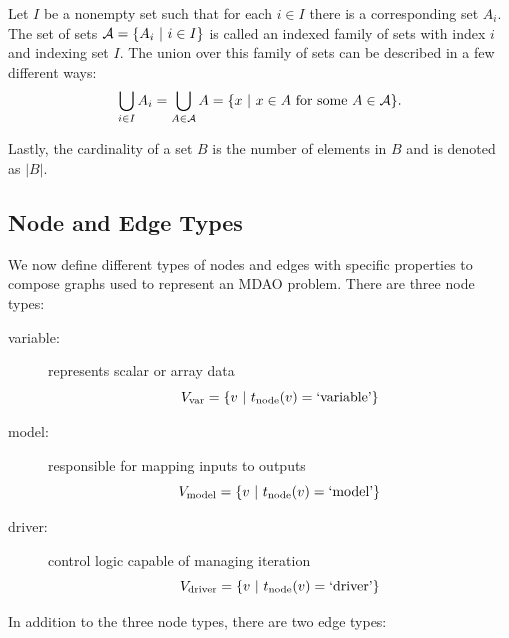   Let $I$ be a nonempty set such that for each $i \in I$ there is a corresponding set $A_i$. 
  The set of sets $\mathcal A = \{A_i \ | \  i \in I\}$ is called an indexed family of sets with index $i$ and 
  indexing set $I$\cite{smith2006}. 
  The union over this family of sets can be described in a few different ways:
  \begin{equation}
  \bigcup_{i \in I} A_i = \bigcup_{A \in \mathcal A} A = \{x \ | \  x \in A \textrm{ for some } A \in \mathcal A\}.
  \end{equation}

  Lastly, the cardinality of a set $B$ is the number of elements in $B$ and is denoted as $|B|$.

\subsection{Node and Edge Types}
  \label{ss:types}
  We now define different types of nodes and edges with specific properties to compose graphs used to represent an MDAO problem. 
  There are three node types:  
  \begin{description}
    \item[variable:] represents scalar or array data
    \begin{equation} 
      V_{\textrm{var}} = \{v \ | \  t_{\textrm{node}}(v) = \textrm{`variable'}\}
    \end{equation}

    \item[model:] responsible for mapping inputs to outputs
    \begin{equation} 
      V_{\textrm{model}} = \{v \ | \  t_{\textrm{node}}(v) = \textrm{`model'}\}
    \end{equation}

    \item[driver:] control logic capable of managing iteration
    \begin{equation} 
      V_{\textrm{driver}} = \{v \ | \  t_{\textrm{node}}(v) = \textrm{`driver'}\}
    \end{equation}

  \end{description}


  In addition to the three node types, there are two edge types: 

